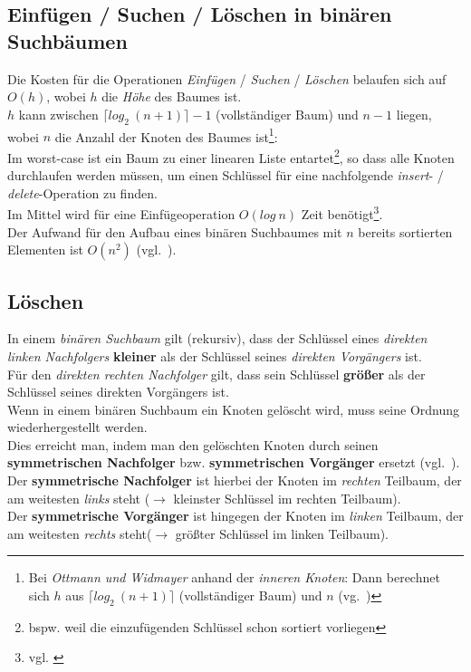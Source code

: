 \subsection{Einfügen / Suchen / Löschen in binären Suchbäumen}

Die Kosten für die Operationen \textit{Einfügen} / \textit{Suchen} / \textit{Löschen} belaufen sich auf $O(h)$, wobei $h$ die \textit{Höhe} des Baumes ist.\\
$h$ kann zwischen $\lceil log_2\ (n + 1) \rceil - 1$ (vollständiger Baum) und $n - 1$ liegen, wobei $n$ die Anzahl der Knoten des Baumes ist\footnote{
Bei \textit{Ottmann und Widmayer} anhand der  \textit{inneren Knoten}: Dann berechnet sich $h$  aus $\lceil log_2\ (n + 1) \rceil$ (vollständiger Baum) und $n$ (vg.~\cite[275]{OW17e})
}:\\
\noindent
Im worst-case ist ein Baum zu einer linearen Liste entartet\footnote{
    bspw. weil die einzufügenden Schlüssel schon sortiert vorliegen
}, so dass alle Knoten durchlaufen werden müssen, um einen Schlüssel für eine nachfolgende \textit{insert}- / \textit{delete}-Operation zu finden.\\

\noindent
Im Mittel wird für eine Einfügeoperation $O(log\ n)$ Zeit benötigt\footnote{
    vgl. \cite[136 ff.]{GD18d}
}.\\


\noindent
Der Aufwand für den Aufbau eines binären Suchbaumes mit $n$ bereits sortierten Elementen ist $O(n^2)$ (vgl.~\cite[235 f.]{GD18d}).


\subsection{Löschen}

In einem \textit{binären Suchbaum} gilt (rekursiv), dass der Schlüssel eines \textit{direkten linken Nachfolgers} \textbf{kleiner} als der Schlüssel seines \textit{direkten Vorgängers} ist.\\
Für den \textit{direkten rechten Nachfolger} gilt, dass sein Schlüssel \textbf{größer} als der Schlüssel seines direkten Vorgängers ist.\\

\noindent
Wenn in einem binären Suchbaum ein Knoten gelöscht wird, muss seine Ordnung wiederhergestellt werden.\\

\noindent
Dies erreicht man, indem man den gelöschten Knoten durch seinen \textbf{symmetrischen Nachfolger} bzw. \textbf{symmetrischen Vorgänger} ersetzt (vgl.~\cite[269, 272]{OW17e}).\\
Der \textbf{symmetrische Nachfolger} ist hierbei der Knoten im \textit{rechten} Teilbaum, der am weitesten \textit{links} steht ($\rightarrow$ kleinster Schlüssel im rechten Teilbaum).\\
Der \textbf{symmetrische Vorgänger} ist hingegen der Knoten im \textit{linken} Teilbaum,  der am weitesten \textit{rechts} steht($\rightarrow$ größter Schlüssel im linken Teilbaum).\\

